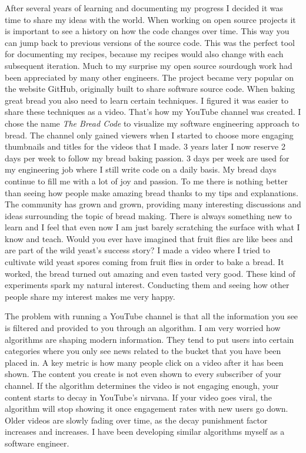 After several years of learning and documenting my progress I decided it was
time to share my ideas with the world. When working on open source projects
it is important to see a history on how the code changes over time. This
way you can jump back to previous versions of the source code. This was
the perfect tool for documenting my recipes, because my recipes would also change
with each subsequent iteration. Much to my surprise my open source sourdough
work had been appreciated by many other engineers. The project became
very popular on the website GitHub, originally built to share software
source code. When baking great bread you also need to learn certain techniques.
I figured it was easier to share these techniques as a video. That's how
my YouTube channel was created. I chose the name {\it The Bread Code} to
visualize my software engineering approach to bread. The channel only gained
viewers when I started to choose more engaging thumbnails and titles for
the videos that I made. 3 years later I now reserve 2 days per week
to follow my bread baking passion. 3 days per week are used for my engineering
job where I still write code on a daily basis. My bread days continue
to fill me with a lot of joy and passion. To me there is nothing better than
seeing how people make amazing bread thanks to my tips and explanations.
The community has grown and grown, providing many interesting discussions
and ideas surrounding the topic of bread making. There is always something
new to learn and I feel that even now I am just barely scratching the surface with
what I know and teach. Would you ever have imagined that fruit flies are like
bees and are part of the wild yeast's success story? I made a video where
I tried to cultivate wild yeast spores coming from fruit flies in order
to bake a bread. It worked, the bread turned out amazing and even tasted
very good. These kind of experiments spark my natural interest. Conducting them
and seeing how other people share my interest makes me very happy.

The problem with running a YouTube channel is that all the information
you see is filtered and provided to you through an algorithm. I am very
worried how algorithms are shaping modern information. They tend to
put users into certain categories where you only see news related
to the bucket that you have been placed in. A key metric is how many
people click on a video after it has been shown. The content you create
is not even shown to every subscriber of your channel. If the algorithm
determines the video is not engaging enough, your content starts to
decay in YouTube's nirvana. If your video goes viral, the algorithm
will stop showing it once engagement rates with new users go down.
Older videos are slowly fading over time, as the decay punishment
factor increases and increases. I have been developing similar algorithms
myself as a software engineer.

